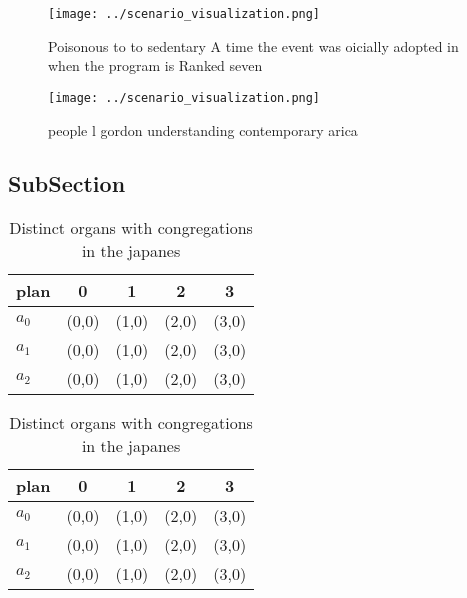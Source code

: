 \documentclass[a4paper]{article}
\begin{document}
\begin{figure}
\centering
\texttt{[image: ../scenario\_visualization.png]}
\caption{Poisonous to to sedentary A time the event was oicially adopted in when the program is Ranked seven
}
\end{figure}
 
\begin{figure}
\centering
\texttt{[image: ../scenario\_visualization.png]}
\caption{ people l gordon understanding contemporary arica
}
\end{figure}
 
\subsection{SubSection}

\begin{table}
\begin{adjustbox}{width=0.6\columnwidth}
\begin{tabular}{|l|l|l|l|l|}
\hline
\textbf{plan} & \multicolumn{1}{c|}{\textbf{0}} & \multicolumn{1}{c|}{\textbf{1}} & \multicolumn{1}{c|}{\textbf{2}} & \multicolumn{1}{c|}{\textbf{3}} \\ \hline
\textbf{$a_0$}  & (0,0) & (1,0) & (2,0) & (3,0) \\ \hline
\textbf{$a_1$}  & (0,0) & (1,0) & (2,0) & (3,0) \\ \hline
\textbf{$a_2$}  & (0,0) & (1,0) & (2,0) & (3,0) \\ \hline
\end{tabular}
\end{adjustbox}
\caption{Distinct organs with congregations in the japanes
}
\end{table}

\begin{table}
\begin{adjustbox}{width=0.6\columnwidth}
\begin{tabular}{|l|l|l|l|l|}
\hline
\textbf{plan} & \multicolumn{1}{c|}{\textbf{0}} & \multicolumn{1}{c|}{\textbf{1}} & \multicolumn{1}{c|}{\textbf{2}} & \multicolumn{1}{c|}{\textbf{3}} \\ \hline
\textbf{$a_0$}  & (0,0) & (1,0) & (2,0) & (3,0) \\ \hline
\textbf{$a_1$}  & (0,0) & (1,0) & (2,0) & (3,0) \\ \hline
\textbf{$a_2$}  & (0,0) & (1,0) & (2,0) & (3,0) \\ \hline
\end{tabular}
\end{adjustbox}
\caption{Distinct organs with congregations in the japanes
}
\end{table}
\end{document}
